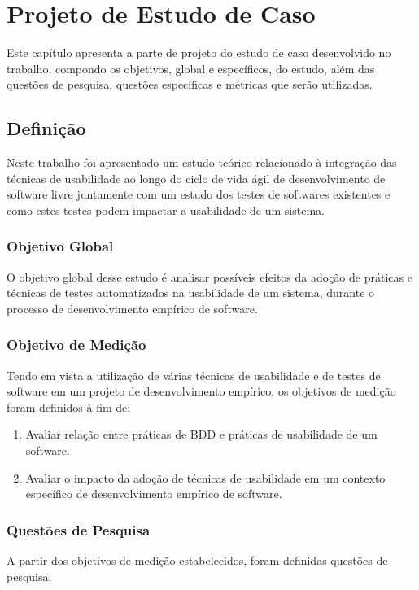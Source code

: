 \chapter{Projeto de Estudo de Caso}


Este capítulo apresenta a parte de projeto do estudo de caso desenvolvido no trabalho, compondo os objetivos, global e específicos, do estudo, além das questões de pesquisa, questões específicas e métricas que serão utilizadas.



\section{Definição}
Neste trabalho foi apresentado um estudo teórico relacionado à integração das técnicas de usabilidade ao longo do ciclo de vida ágil de desenvolvimento de software livre juntamente com um estudo dos testes de softwares existentes e como estes testes podem impactar a usabilidade de um sistema.


\subsection{Objetivo Global}

O objetivo global desse estudo é analisar possíveis efeitos da adoção de práticas e técnicas de testes automatizados na usabilidade de um sistema, durante o processo de desenvolvimento empírico de software.

\subsection{Objetivo de Medição}

Tendo em vista a utilização de várias técnicas de usabilidade e de testes de software em um projeto de desenvolvimento empírico, os objetivos de medição foram definidos à fim de:

\begin{enumerate}
\item Avaliar relação entre práticas de BDD e práticas de usabilidade de um software. 

\item Avaliar o impacto da adoção de técnicas de usabilidade em um contexto específico de desenvolvimento empírico de software.
\end{enumerate}

\subsection{Questões de Pesquisa}
A partir dos objetivos de medição estabelecidos, foram definidas questões de pesquisa:


